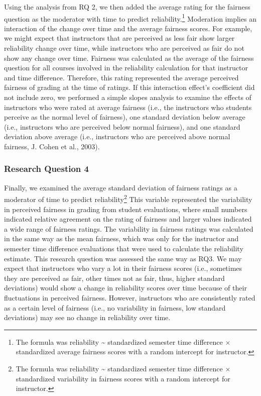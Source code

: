 \documentclass[
  man,mask]{apa7}
\begin{document}
Using the analysis from RQ 2, we then added the average rating for the
fairness question as the moderator with time to predict
reliability.\footnote{The formula was reliability \textasciitilde{} standardized semester time
  difference \(\times\) standardized average fairness scores with a random
  intercept for instructor.} Moderation implies an interaction of the
change over time and the average fairness scores. For example, we might
expect that instructors that are perceived as less fair show larger
reliability change over time, while instructors who are perceived as
fair do not show any change over time. Fairness was calculated as the
average of the fairness question for all courses involved in the
reliability calculation for that instructor and time difference.
Therefore, this rating represented the average perceived fairness of
grading at the time of ratings. If this interaction effect's coefficient
did not include zero, we performed a simple slopes analysis to examine
the effects of instructors who were rated at average fairness (i.e., the
instructors who students perceive as the normal level of fairness), one
standard deviation below average (i.e., instructors who are perceived
below normal fairness), and one standard deviation above average (i.e.,
instructors who are perceived above normal fairness, J. Cohen et al., 2003).

\subsubsection{Research Question 4}\label{research-question-4}

Finally, we examined the average standard deviation of fairness ratings
as a moderator of time to predict reliability\footnote{The formula was
  reliability \textasciitilde{} standardized semester time difference \(\times\) standardized
  variability in fairness scores with a random intercept for instructor.}
This variable represented the variability in perceived fairness in
grading from student evaluations, where small numbers indicated relative
agreement on the rating of fairness and larger values indicated a wide
range of fairness ratings. The variability in fairness ratings was
calculated in the same way as the mean fairness, which was only for the
instructor and semester time difference evaluations that were used to
calculate the reliability estimate. This research question was assessed the same way as RQ3. We may expect that instructors who vary a lot in their fairness scores (i.e., sometimes they are perceived as fair, other times not as fair, thus, higher standard deviations) would show a change in reliability scores over time because of their fluctuations in perceived fairness. However, instructors who are consistently rated as a certain level of fairness (i.e., no variability in fairness, low standard deviations) may see no change in reliability over time.
\end{document}
